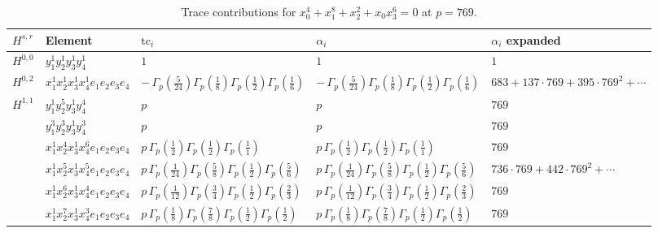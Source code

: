 \documentclass[11pt]{article}
\begin{document}
\begin{table}[ht]
\centering
\caption{Trace contributions for $x_0^{4} + x_1^{8} + x_2^{2} + x_0 x_3^{6} = 0$ at $p=769$.}\label{tab:deformed-9}
\renewcommand{\arraystretch}{1.1}
{\scriptsize
\begin{tabular}{@{}lllll@{}}
\toprule
$H^{s,r}$ & Element & $\mathrm{tc}_i$ & $\alpha_i$ & $\alpha_i$ expanded \\
\midrule
$H^{0,0}$ & $y_{1}^{1} y_{2}^{1} y_{3}^{1} y_{4}^{1}$ & $1$ & $1$ & $1$ \\
\midrule
$H^{0,2}$ & $x_{1}^{1} x_{2}^{1} x_{3}^{1} x_{4}^{1}  e_{1} e_{2} e_{3} e_{4}$ & $- \, \Gamma_p \left( \frac{5}{24} \right) \Gamma_p \left( \frac{1}{8} \right) \Gamma_p \left( \frac{1}{2} \right) \Gamma_p \left( \frac{1}{6} \right)$ & $- \, \Gamma_p \left( \frac{5}{24} \right) \Gamma_p \left( \frac{1}{8} \right) \Gamma_p \left( \frac{1}{2} \right) \Gamma_p \left( \frac{1}{6} \right)$ & $683{+}137{\cdot}769{+}395{\cdot}769^{2}{+}\cdots$ \\
\midrule
$H^{1,1}$ & $y_{1}^{1} y_{2}^{5} y_{3}^{1} y_{4}^{4}$ & $p \,$ & $p \,$ & $769$ \\
 & $y_{1}^{3} y_{2}^{3} y_{3}^{1} y_{4}^{3}$ & $p \,$ & $p \,$ & $769$ \\
 & $x_{1}^{1} x_{2}^{4} x_{3}^{1} x_{4}^{6}  e_{1} e_{2} e_{3} e_{4}$ & $p \, \Gamma_p \left( \frac{1}{2} \right) \Gamma_p \left( \frac{1}{2} \right) \Gamma_p \left( \frac{1}{1} \right)$ & $p \, \Gamma_p \left( \frac{1}{2} \right) \Gamma_p \left( \frac{1}{2} \right) \Gamma_p \left( \frac{1}{1} \right)$ & $769$ \\
 & $x_{1}^{1} x_{2}^{5} x_{3}^{1} x_{4}^{5}  e_{1} e_{2} e_{3} e_{4}$ & $p \, \Gamma_p \left( \frac{1}{24} \right) \Gamma_p \left( \frac{5}{8} \right) \Gamma_p \left( \frac{1}{2} \right) \Gamma_p \left( \frac{5}{6} \right)$ & $p \, \Gamma_p \left( \frac{1}{24} \right) \Gamma_p \left( \frac{5}{8} \right) \Gamma_p \left( \frac{1}{2} \right) \Gamma_p \left( \frac{5}{6} \right)$ & $736{\cdot}769{+}442{\cdot}769^{2}{+}\cdots$ \\
 & $x_{1}^{1} x_{2}^{6} x_{3}^{1} x_{4}^{4}  e_{1} e_{2} e_{3} e_{4}$ & $p \, \Gamma_p \left( \frac{1}{12} \right) \Gamma_p \left( \frac{3}{4} \right) \Gamma_p \left( \frac{1}{2} \right) \Gamma_p \left( \frac{2}{3} \right)$ & $p \, \Gamma_p \left( \frac{1}{12} \right) \Gamma_p \left( \frac{3}{4} \right) \Gamma_p \left( \frac{1}{2} \right) \Gamma_p \left( \frac{2}{3} \right)$ & $769$ \\
 & $x_{1}^{1} x_{2}^{7} x_{3}^{1} x_{4}^{3}  e_{1} e_{2} e_{3} e_{4}$ & $p \, \Gamma_p \left( \frac{1}{8} \right) \Gamma_p \left( \frac{7}{8} \right) \Gamma_p \left( \frac{1}{2} \right) \Gamma_p \left( \frac{1}{2} \right)$ & $p \, \Gamma_p \left( \frac{1}{8} \right) \Gamma_p \left( \frac{7}{8} \right) \Gamma_p \left( \frac{1}{2} \right) \Gamma_p \left( \frac{1}{2} \right)$ & $769$ \\

\end{tabular}}
\end{table}
\end{document}
